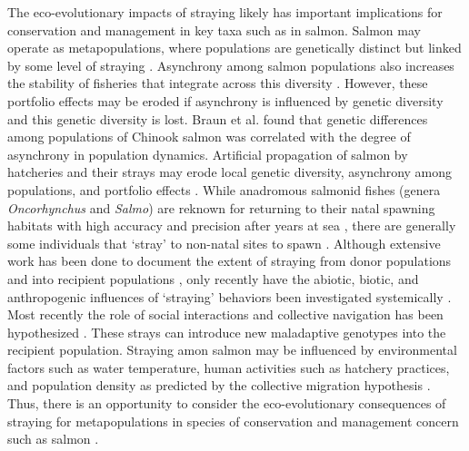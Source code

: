 \documentclass[twocolumn,preprintnumbers,amsmath,amssymb,superscriptaddress]{revtex4}
\begin{document}
The eco-evolutionary impacts of straying likely has important implications for conservation and management in key taxa such as in salmon.
Salmon may operate as metapopulations, where populations are genetically distinct but linked by some level of straying \cite{Schtickzelle:2007wb,Anderson:2014cx}.
Asynchrony among salmon populations also increases the stability of fisheries that integrate across this diversity \cite{Schindler:2010he,Anonymous:2016jc}.
However, these portfolio effects may be eroded if asynchrony is influenced by genetic diversity and this genetic diversity is lost. 
Braun et al. \cite{Braun:2016ib} found that genetic differences among populations of Chinook salmon was correlated with the degree of asynchrony in population dynamics. 
Artificial propagation of salmon by hatcheries and their strays may erode local genetic diversity, asynchrony among populations, and portfolio effects \cite{Carlson:2008hl,Moore:2010gs,Anonymous:2014ku}.  
While anadromous salmonid fishes (genera \emph{Oncorhynchus} and \emph{Salmo}) are reknown for returning to their natal spawning habitats with high accuracy and precision after years at sea \cite{Quinn:2011tf,Jonsson:2011kg,Keefer:2014gg}, there are generally some individuals that `stray' to non-natal sites to spawn \cite{Quinn:1993ge,Hendry:2004wf}.
Although extensive work has been done to document the extent of straying from donor populations and into recipient populations \cite{Keefer:2014gg,Bett:2017ha}, only recently have the abiotic, biotic, and anthropogenic influences of `straying' behaviors been investigated systemically \cite{Keefer:2008bs,Westley:2015to,Bond:2016dz}.
Most recently the role of social interactions and collective navigation has been hypothesized \cite{Berdahl:2015kv,Berdahl:2016dx}.
These strays can introduce new maladaptive genotypes into the recipient population.
Straying amon salmon may be influenced by environmental factors such as water temperature, human activities such as hatchery practices, and population density as predicted by the collective migration hypothesis \cite{Peterson:2014gy}. 
Thus, there is an opportunity to consider the eco-evolutionary consequences of straying for metapopulations in species of conservation and management concern such as salmon \cite{Carlson:2011ce}. 
\end{document}
